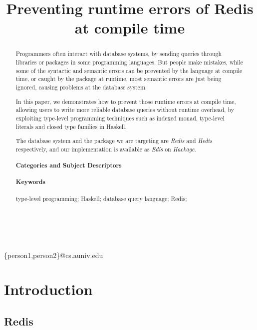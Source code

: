 \documentclass[pldi]{sigplanconf-pldi16}
\begin{document}
\title{Preventing runtime errors of Redis at compile time}

%
%

{ \\
  \\
}
{\{person1,person2\}@cs.auniv.edu}

\maketitle

\begin{abstract}
Programmers often interact with database systems, by sending queries through
libraries or packages in some programming languages. But people make mistakes,
while some of the syntactic and semantic errors can be prevented by the language
at compile time, or caught by the package at runtime, most semantic errors are
just being ignored, causing problems at the database system.

In this paper, we demonstrates how to prevent those runtime errors at compile
time, allowing users to write more reliable database queries without runtime
overhead, by exploiting type-level programming techniques such as indexed
monad, type-level literals and closed type families in Haskell.

The database system and the package we are targeting
are \emph{Redis} and \emph{Hedis} respectively, and our implementation is
available as \emph{Edis} on \emph{Hackage}.

\paragraph{Categories and Subject Descriptors}
\paragraph{Keywords}
type-level programming; Haskell; database query language; Redis;
\end{abstract}

\section{Introduction}

\subsection{Redis}
\end{document}
